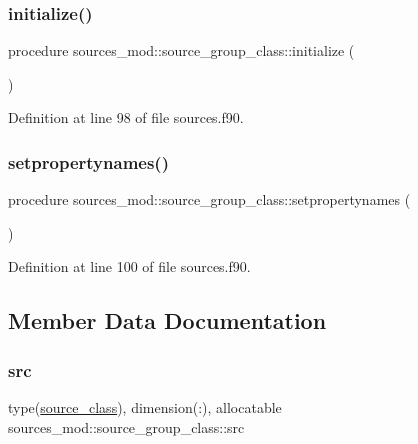 \subsubsection{\texorpdfstring{initialize()}{initialize()}}
{\footnotesize\ttfamily procedure sources\+\_\+mod\+::source\+\_\+group\+\_\+class\+::initialize (\begin{DoxyParamCaption}{ }\end{DoxyParamCaption})\hspace{0.3cm}{\ttfamily [private]}}



Definition at line 98 of file sources.\+f90.

\mbox{\label{structsources__mod_1_1source__group__class_afcd9f3654f50966bc72ffc32b4bee7dd}} 
\subsubsection{\texorpdfstring{setpropertynames()}{setpropertynames()}}
{\footnotesize\ttfamily procedure sources\+\_\+mod\+::source\+\_\+group\+\_\+class\+::setpropertynames (\begin{DoxyParamCaption}{ }\end{DoxyParamCaption})\hspace{0.3cm}{\ttfamily [private]}}



Definition at line 100 of file sources.\+f90.



\subsection{Member Data Documentation}
\mbox{\label{structsources__mod_1_1source__group__class_af970ce2c935528f707bdbf4169995d7c}} 
\subsubsection{\texorpdfstring{src}{src}}
{\footnotesize\ttfamily type(\mbox{\hyperlink{structsources__mod_1_1source__class}{source\+\_\+class}}), dimension(\+:), allocatable sources\+\_\+mod\+::source\+\_\+group\+\_\+class\+::src\hspace{0.3cm}{\ttfamily [private]}}



